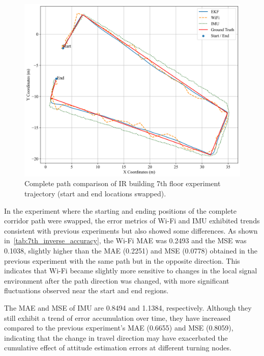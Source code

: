 \documentclass[12pt,a4paper]{article}
\numberwithin{equation}{section}
\begin{document}
\begin{figure}[H]
  \centering
  \includegraphics[width=0.8\linewidth]{images/1/0.png}
  \caption{Complete path comparison of IR building 7th floor experiment
    trajectory (start and end locations swapped).}
  \label{fig:Complete path comparison of IR building 7th floor experiment
    trajectory (start and end locations swapped)}
\end{figure}

In the experiment where the starting and ending positions of the complete
corridor path were swapped, the error metrics of Wi-Fi and IMU exhibited trends
consistent with previous experiments but also showed some differences. As shown
in~\autoref{tab:7th_inverse_accuracy}, the Wi-Fi MAE was 0.2493 and the MSE was
0.1038, slightly higher than the MAE (0.2251) and MSE (0.0778) obtained in the
previous experiment with the same path but in the opposite direction. This
indicates that Wi-Fi became slightly more sensitive to changes in the local
signal environment after the path direction was changed, with more significant
fluctuations observed near the start and end regions.

The MAE and MSE of IMU are 0.8494 and 1.1384, respectively. Although they still
exhibit a trend of error accumulation over time, they have increased compared to
the previous experiment's MAE (0.6655) and MSE (0.8059), indicating that the
change in travel direction may have exacerbated the cumulative effect of
attitude estimation errors at different turning nodes.
\end{document}
